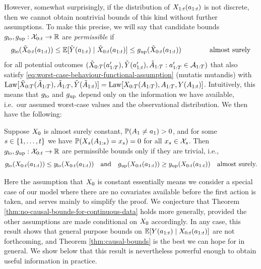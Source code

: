 However, somewhat surprisingly, if the distribution of $X_{1:t}(a_{1:t})$ is not discrete, then we cannot obtain nontrivial bounds of this kind without further assumptions.
To make this precise, we will say that candidate bounds $g_{\mathrm{lo}}, g_{\mathrm{up}} : \mathcal{X}_{0:t} \to \mathbb{R}$ are \emph{permissible} if
\begin{equation} \label{eq:glo-works-for-all-models}
    g_{\mathrm{lo}}(\tilde{X}_{0:t}(a_{1:t})) \leq \mathbb{E}[\tilde{Y}(a_{1:t}) \mid \tilde{X}_{0:t}(a_{1:t})] \leq g_{\mathrm{up}}(\tilde{X}_{0:t}(a_{1:t})) \qquad \qquad \text{almost surely}
\end{equation}
for all potential outcomes $(\tilde{X}_{0:T}(a_{1:T}'), \tilde{Y}(a_{1:t}'), \tilde{A}_{1:T} : a_{1:T}' \in \mathcal{A}_{1:T})$ that also satisfy \eqref{eq:worst-case-behaviour-functional-assumption} (mutatis mutandis) with $\mathrm{Law}[\tilde{X}_{0:T}(\tilde{A}_{1:T}), \tilde{A}_{1:T}, \tilde{Y}(\tilde{A}_{1:t})] = \mathrm{Law}[X_{0:T}(A_{1:T}), A_{1:T}, Y(A_{1:t})]$.
Intuitively, this means that $g_{\mathrm{lo}}$ and $g_{\mathrm{up}}$ depend only on the information we have available, i.e.\ our assumed worst-case values and the observational distribution.
We then have the following:

%
%

%

%
%
%
%
%

\begin{theorem} \label{thm:no-causal-bounds-for-continuous-data}
    Suppose $X_0$ is almost surely constant, $\mathbb{P}(A_1 \neq a_1) > 0$, and for some $s \in \{1, \ldots, t\}$ we have $\mathbb{P}(X_{s}(A_{1:s}) = x_{s}) = 0$ for all $x_{s} \in \mathcal{X}_{s}$.
    Then $g_{\mathrm{lo}}, g_{\mathrm{up}} : \mathcal{X}_{0:t} \to \mathbb{R}$ are permissible bounds only if they are trivial, i.e.,
    \begin{align*}
        g_{\mathrm{lo}}(X_{0:t}(a_{1:t})) \leq y_{\mathrm{lo}}(X_{0:t}(a_{1:t})) \quad \textup{and} \quad g_{\mathrm{up}}(X_{0:t}(a_{1:t})) \geq y_{\mathrm{up}}(X_{0:t}(a_{1:t})) \quad \textup{almost surely.}
    \end{align*}
\end{theorem}

Here the assumption that $X_0$ is constant essentially means we consider a special case of our model where there are no covariates available before the first action is taken, and serves mainly to simplify the proof.
We conjecture that Theorem \ref{thm:no-causal-bounds-for-continuous-data} holds more generally, provided the other assumptions are made conditional on $X_0$ accordingly.
%
%
In any case, this result shows that general purpose bounds on $\mathbb{E}[Y(a_{1:t}) \mid X_{0:t}(a_{1:t})]$ are not forthcoming, and Theorem \ref{thm:causal-bounds} is the best we can hope for in general.
We show below that this result is nevertheless powerful enough to obtain useful information in practice.

